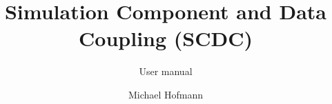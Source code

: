 \documentclass[
11pt,
a4paper,
parskip=true,
DIV=12,
]{scrreprt}
\begin{document}
\title{Simulation Component and Data Coupling (SCDC)}
\subtitle{User manual}

\author{Michael Hofmann}

\maketitle

\setcounter{tocdepth}{1}
\tableofcontents









\end{document}
